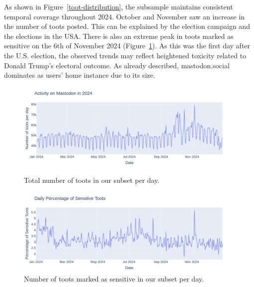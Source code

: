 As shown in Figure~\ref{toot-distribution}, the subsample maintains consistent temporal coverage throughout 2024. October and November saw an increase in the number of toots posted. This can be explained by the election campaign and the elections in the USA. There is also an extreme peak in toots marked as sensitive on the 6th of November 2024 (Figure~\ref{sensitive-toots}). As this was the first day after the U.S. election, the observed trends may reflect heightened toxicity related to Donald Trump’s electoral outcome. As \citet{he:2023} already described, mastodon.social dominates as users' home instance due to its size.

\begin{figure}[tb]
    \centering
    \includegraphics[width=\textwidth]{../material/activity_2024.png}
    \caption{Total number of toots in our subset per day.}
    \label{toot-distribution}
    \includegraphics[width=\textwidth]{../material/sensitive_toots.png}
    \caption{Number of toots marked as sensitive in our subset per day.}
    \label{sensitive-toots}
\end{figure}